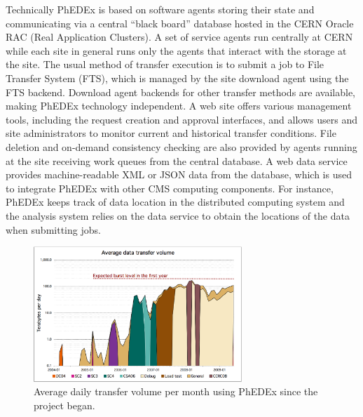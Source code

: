 Technically PhEDEx is based on software agents storing their state and
communicating via a central ``black board'' database hosted in the
CERN Oracle RAC (Real Application Clusters). A set of service agents
run centrally at CERN while each site in general runs
only the agents that interact with the storage at the site. The usual
method of transfer execution is to submit a job to File Transfer System (FTS), 
which is managed by the site download agent using the FTS backend.  Download
agent backends for other transfer methods are available, making PhEDEx
technology independent. A web site offers various management tools,
including the request creation and approval interfaces, and allows
users and site administrators to monitor current and historical
transfer conditions.  File deletion and on-demand consistency checking
are also provided by agents running at the site receiving work queues
from the central database.  A web data service provides
machine-readable XML or JSON data from the database, which is used to
integrate PhEDEx with other CMS computing components.  For instance,
PhEDEx keeps track of data location in the distributed computing
system and the analysis system relies on the data service to obtain
the locations of the data when submitting jobs.

\begin{figure}
\centering
 \includegraphics[width=0.70\textwidth]{phedex-avg-monthly-volume.eps}
\caption{Average daily transfer volume per month using PhEDEx since the project began.}
\label{fig:phedex-transfers}
\end{figure}

